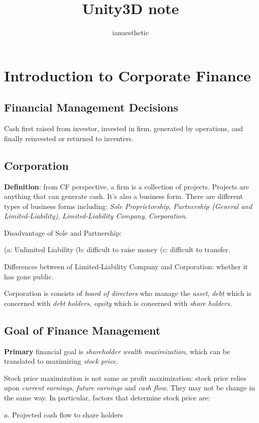 \documentclass[10pt, a4paper]{article}
\author{ianaesthetic}
\title{Unity3D note}
\begin{document}
    \section{Introduction to Corporate Finance}
        \subsection{Financial Management Decisions}
            Cash first raised from investor, invested in firm, generated by operations, and finally reinvested or returned to inventers.
        \subsection{Corporation}
            \textbf{Definition}: from CF perspective, a firm is a collection of projects. Projects are anything that can generate cash. It's also a business form. There are different types of business forms including: \emph{Sole Proprietorship}, \emph{Partnership (General and Limited-Liability)}, \emph{Limited-Liability Company}, \emph{Corporation}.

            Disadvantage of Sole and Partnership: 

                (a: Unlimited Liability
                (b: difficult to raise money 
                (c: difficult to transfer. 
            
            Differences between of Limited-Liability Company and Corporation: whether it has gone public. 
            
            Corporation is consists of \emph{board of directors} who manage the \emph{asset}, \emph{debt} which is concerned with \emph{debt holders},  \emph{equity} which is concerned with \emph{share holders}.

        \subsection{Goal of Finance Management}
            \textbf{Primary} financial goal is \emph{shareholder wealth maximization}, which can be translated to maximizing \emph{stock price}. 
            
            Stock price maximization is not same as profit maximization: stock price relies upon \emph{current earnings}, \emph{future earnings} and \emph{cash flow}. They may not be change in the same way. In particular, factors that determine stock price are: 

            $a$. Projected cash flow to share holders
            
\end{document}
